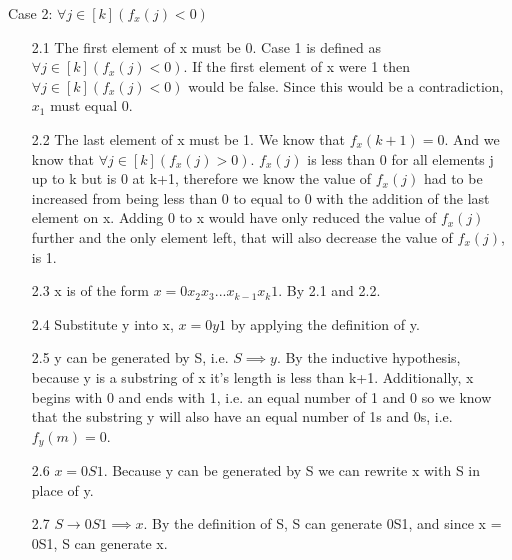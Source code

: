 \documentclass[11pt]{article}
\def\imp{\rightarrow}
\begin{document}
\begin{enumerate}
	Case 2: $\forall j \in [k] (f_x(j) < 0)$
	\begin{enumerate}
		\item[2.1] The first element of x must be 0. Case 1 is defined as $\forall j \in [k] (f_x(j) < 0)$. If the first element of x were 1 then $\forall j \in [k] (f_x(j) < 0)$ would be false. Since this would be a contradiction, $x_1$ must equal 0. 
		\item[2.2] The last element of x must be 1. We know that $f_x(k+1)=0$. And we know that $\forall j \in [k] (f_x(j) > 0)$. $f_x(j)$ is less than 0 for all elements j up to k but is 0 at k+1, therefore we know the value of $f_x(j)$ had to be increased from being less than 0 to equal to 0 with the addition of the last element on x. Adding 0 to x would have only reduced the value of $f_x(j)$ further and the only element left, that will also decrease the value of $f_x(j)$, is 1. 
		\item[2.3] x is of the form $x=0 x_2 x_3 ... x_{k-1} x_k 1$. By 2.1 and 2.2.  
		\item[2.4] Substitute y into x, $x=0y1$ by applying the definition of y.  
		\item[2.5] y can be generated by S, i.e. $S \implies y$. By the inductive hypothesis, because y is a substring of x it's length is less than k+1. Additionally, x begins with 0 and ends with 1, i.e. an equal number of 1 and 0 so we know that the substring y will also have an equal number of 1s and 0s, i.e. $f_y(m)=0$. 
		\item[2.6] $x=0S1$. Because y can be generated by S we can rewrite x with S in place of y. 
		\item[2.7] $S \imp 0S1 \implies x$. By the definition of S, S can generate 0S1, and since x = 0S1, S can generate x. 
	\end{enumerate}
	

\end{enumerate}
\end{document}
